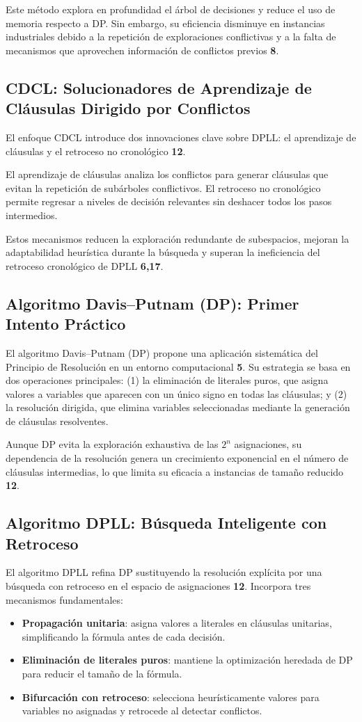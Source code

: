 Este método explora en profundidad el árbol de decisiones y reduce el uso de memoria respecto a DP. Sin embargo, su eficiencia disminuye en instancias industriales debido a la repetición de exploraciones conflictivas y a la falta de mecanismos que aprovechen información de conflictos previos \textbf{8}.

\subsection{CDCL: Solucionadores de Aprendizaje de Cláusulas Dirigido por Conflictos}
El enfoque CDCL introduce dos innovaciones clave sobre DPLL: el aprendizaje de cláusulas y el retroceso no cronológico \textbf{12}.  

El aprendizaje de cláusulas analiza los conflictos para generar cláusulas que evitan la repetición de subárboles conflictivos. El retroceso no cronológico permite regresar a niveles de decisión relevantes sin deshacer todos los pasos intermedios.  

Estos mecanismos reducen la exploración redundante de subespacios, mejoran la adaptabilidad heurística durante la búsqueda y superan la ineficiencia del retroceso cronológico de DPLL \textbf{6,17}.


\subsection{Algoritmo Davis–Putnam (DP): Primer Intento Práctico}
El algoritmo Davis–Putnam (DP) propone una aplicación sistemática del Principio de Resolución en un entorno computacional \textbf{5}. Su estrategia se basa en dos operaciones principales: (1) la eliminación de literales puros, que asigna valores a variables que aparecen con un único signo en todas las cláusulas; y (2) la resolución dirigida, que elimina variables seleccionadas mediante la generación de cláusulas resolventes.  

Aunque DP evita la exploración exhaustiva de las $2^n$ asignaciones, su dependencia de la resolución genera un crecimiento exponencial en el número de cláusulas intermedias, lo que limita su eficacia a instancias de tamaño reducido \textbf{12}.

\subsection{Algoritmo DPLL: Búsqueda Inteligente con Retroceso}
El algoritmo DPLL refina DP sustituyendo la resolución explícita por una búsqueda con retroceso en el espacio de asignaciones \textbf{12}. Incorpora tres mecanismos fundamentales:
\begin{itemize}
  \item \textbf{Propagación unitaria}: asigna valores a literales en cláusulas unitarias, simplificando la fórmula antes de cada decisión.
  \item \textbf{Eliminación de literales puros}: mantiene la optimización heredada de DP para reducir el tamaño de la fórmula.
  \item \textbf{Bifurcación con retroceso}: selecciona heurísticamente valores para variables no asignadas y retrocede al detectar conflictos.
\end{itemize}

